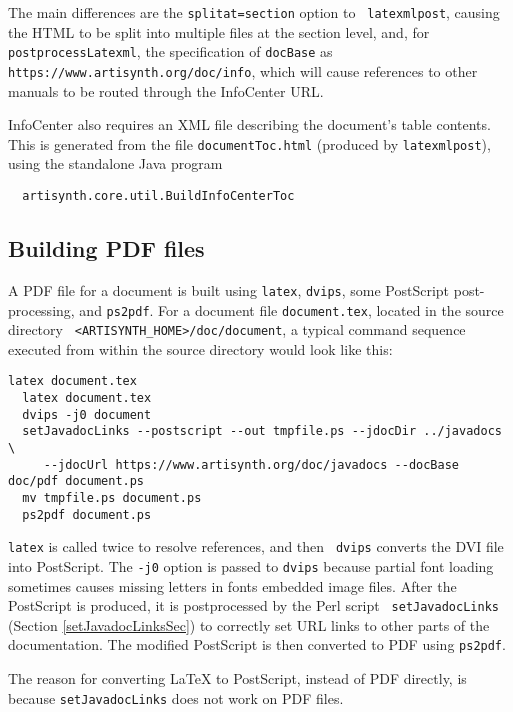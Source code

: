 \documentclass{article}
\begin{document}
The main differences are the {\tt \DHY splitat=section} option to {\tt
latexmlpost}, causing the HTML to be split into multiple files at the
section level, and, for {\tt postprocessLatexml}, the specification of
{\tt \DHY docBase} as\\ {\tt https://www.artisynth.org/doc/info},
which will cause references to other manuals to be routed through the
InfoCenter URL.

InfoCenter also requires an XML file describing the document's table
contents. This is generated from the file {\tt documentToc.html}
(produced by {\tt latexmlpost}), using the standalone Java program
%
\begin{verbatim}
  artisynth.core.util.BuildInfoCenterToc
\end{verbatim}
%

\subsection{Building PDF files}
\label{BuildingPDFSec}

A PDF file for a document is built using {\tt latex}, {\tt dvips},
some PostScript post-processing, and {\tt ps2pdf}. For a document file
{\tt document.tex}, located in the source directory {\tt
<ARTISYNTH\_HOME>/doc/document}, a typical command sequence executed
from within the source directory would look like this:

\begin{lstlisting}[]
  latex document.tex
  latex document.tex
  dvips -j0 document
  setJavadocLinks --postscript --out tmpfile.ps --jdocDir ../javadocs \
     --jdocUrl https://www.artisynth.org/doc/javadocs --docBase doc/pdf document.ps
  mv tmpfile.ps document.ps
  ps2pdf document.ps
\end{lstlisting}

{\tt latex} is called twice to resolve references, and then {\tt
dvips} converts the DVI file into PostScript. The {\tt -j0} option is
passed to {\tt dvips} because partial font loading sometimes causes
missing letters in fonts embedded image files.  After the PostScript
is produced, it is postprocessed by the Perl script {\tt
setJavadocLinks} (Section \ref{setJavadocLinksSec}) to correctly set
URL links to other parts of the documentation. The modified PostScript
is then converted to PDF using {\tt ps2pdf}.

\begin{sideblock}
The reason for converting LaTeX to PostScript, instead of PDF directly, is because
{\tt setJavadocLinks} does not work on PDF files.
\end{sideblock}
\end{document}
